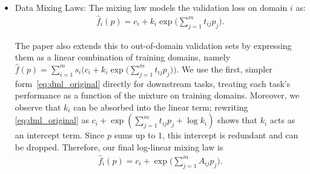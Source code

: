 \begin{itemize}
     \item Data Mixing Laws: The mixing law models the validation loss on domain $i$ as:
     \begin{align}
         \hat{f}_i(p) = c_i + k_i \exp\bigg(\sum_{j = 1}^m t_{ij} p_j\bigg).\label{eq:dml_original}
     \end{align}

     The paper also extends this to out-of-domain validation sets by expressing them as a linear combination of training domains, namely $\hat{f}(p) = \sum_{i = 1}^m s_i \Big(c_i + k_i \exp \big(\sum_{j = 1}^m t_{ij} p_j\big) \Big)$. We use the first, simpler form~\eqref{eq:dml_original} directly for downstream tasks, treating each task's performance as a function of the mixture on training domains. Moreover, we observe that $k_i$ can be absorbed into the linear term; rewriting \eqref{eq:dml_original} as $c_i + \exp(\sum_{j = 1}^m t_{ij} p_j + \log k_i)$ shows that $k_i$ acts as an intercept term.  Since $p$ sums up to $1$, this intercept is redundant and can be dropped. Therefore, our final log-linear mixing law is
     \begin{align}
         \hat{f}_i(p) = c_i + \exp\bigg(\sum_{j = 1}^m A_{ij} p_j\bigg). \label{eq:app_log_linear}
     \end{align}
     
    \end{itemize}


